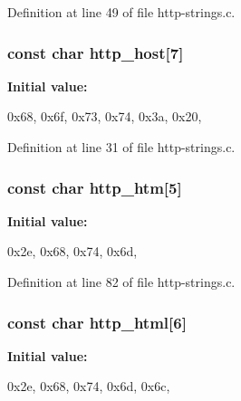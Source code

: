 Definition at line 49 of file http-\/strings.c.

\hypertarget{http-strings_8c_a61e4dca10281be3a140757f3d8fbf019}{
\subsubsection[{http\_\-host}]{\setlength{\rightskip}{0pt plus 5cm}const char {\bf http\_\-host}\mbox{[}7\mbox{]}}}
\label{http-strings_8c_a61e4dca10281be3a140757f3d8fbf019}
{\bfseries Initial value:}
\begin{DoxyCode}
 

{0x68, 0x6f, 0x73, 0x74, 0x3a, 0x20, }
\end{DoxyCode}


Definition at line 31 of file http-\/strings.c.

\hypertarget{http-strings_8c_a26642210d36f0e7f65fb3a98402e8f88}{
\subsubsection[{http\_\-htm}]{\setlength{\rightskip}{0pt plus 5cm}const char {\bf http\_\-htm}\mbox{[}5\mbox{]}}}
\label{http-strings_8c_a26642210d36f0e7f65fb3a98402e8f88}
{\bfseries Initial value:}
\begin{DoxyCode}
 

{0x2e, 0x68, 0x74, 0x6d, }
\end{DoxyCode}


Definition at line 82 of file http-\/strings.c.

\hypertarget{http-strings_8c_ac61a385f177ab70118739cc3e38c11af}{
\subsubsection[{http\_\-html}]{\setlength{\rightskip}{0pt plus 5cm}const char {\bf http\_\-html}\mbox{[}6\mbox{]}}}
\label{http-strings_8c_ac61a385f177ab70118739cc3e38c11af}
{\bfseries Initial value:}
\begin{DoxyCode}
 

{0x2e, 0x68, 0x74, 0x6d, 0x6c, }
\end{DoxyCode}



